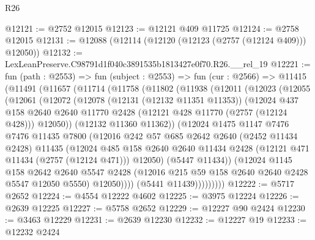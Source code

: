 \begin{lexlean}{R26}
\begin{coremodule}
@12121 := @2752 @12015
@12123 := @12121 @409 @11725
@12124 := @2758 @12015
@12131 := @12088 (@12114 (@12120 (@12123 (@2757 (@12124 @409))) @12050))
@12132 := LexLeanPreserve.C98791d1f040c3891535b1813427e0f70.R26.__rel_19
@12221 := fun (path : @2553) =>
  fun (subject : @2553) =>
  fun (cur : @2566) =>
  @11415
    (@11491
      (@11657
        (@11714
          (@11758
            (@11802
              (@11938
                (@12011
                  (@12023
                    (@12055
                      (@12061
                        (@12072
                          (@12078
                            (@12131 (@12132 @11351 @11353))
                            (@12024
                              @437
                              @158
                              @2640
                              @2640
                              @11770
                              @2428
                              (@12121 @428 @11770 (@2757 (@12124 @428)))
                              @12050))
                          (@12132 @11360 @11362))
                        (@12024
                          @1475
                          @1147
                          @7476
                          @7476
                          @11435
                          @7800
                          (@12016
                            @242
                            @57
                            @685
                            @2642
                            @2640
                            (@2452 @11434 @2428)
                            @11435
                            (@12024
                              @485
                              @158
                              @2640
                              @2640
                              @11434
                              @2428
                              (@12121 @471 @11434 (@2757 (@12124 @471)))
                              @12050)
                            (@5447 @11434))
                          (@12024
                            @1145
                            @158
                            @2642
                            @2640
                            @5547
                            @2428
                            (@12016 @215 @59 @158 @2640 @2640 @2428 @5547 @12050 @5550)
                            @12050))))
                    (@5441 @11439)))))))))
@12222 := @5717 @2652
@12224 := @4554 @12222 @4602
@12225 := @3975 @12224
@12226 := @2639 @12225
@12227 := @5758 @2652
@12229 := @12227 @90 @2424
@12230 := @3463 @12229
@12231 := @2639 @12230
@12232 := @12227 @19
@12233 := @12232 @2424

\end{coremodule}
\end{lexlean}

